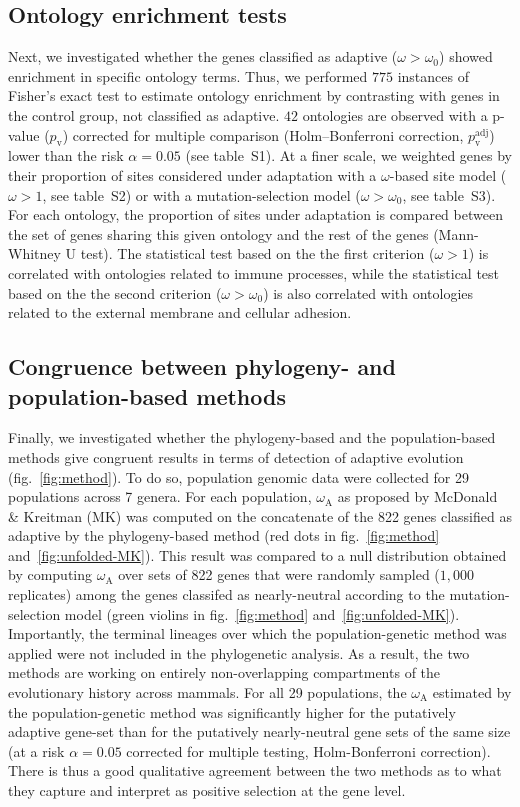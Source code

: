 \documentclass{article}
\newcommand{\rateApop}{\omega_{\mathrm{A}}}
\begin{document}
    \subsection*{Ontology enrichment tests}
    Next, we investigated whether the genes classified as adaptive ($\omega > \omega_{0}$) showed enrichment in specific ontology terms.
    Thus, we performed $775$ instances of Fisher's exact test to estimate ontology enrichment by contrasting with genes in the control group, not classified as adaptive.
    $42$ ontologies are observed with a p-value ($p_{\mathrm{v}}$) corrected for multiple comparison (Holm–Bonferroni correction, $p_{\mathrm{v}}^{\mathrm{adj}}$) lower than the risk $\alpha=0.05$ (see table~S1).
    At a finer scale, we weighted genes by their proportion of sites considered under adaptation with a $\omega$-based site model ($\omega > 1$, see table~S2) or with a mutation-selection model ($\omega > \omega_{0}$, see table~S3).
    For each ontology, the proportion of sites under adaptation is compared between the set of genes sharing this given ontology and the rest of the genes (Mann-Whitney U test).
    The statistical test based on the the first criterion ($\omega>1$) is correlated with ontologies related to immune processes, while the statistical test based on the the second criterion ($\omega > \omega_{0}$) is also correlated with ontologies related to the external membrane and cellular adhesion.

    \subsection*{Congruence between phylogeny- and population-based methods}
    Finally, we investigated whether the phylogeny-based and the population-based methods give congruent results in terms of detection of adaptive evolution (fig.~\ref{fig:method}).
    To do so, population genomic data were collected for 29 populations across 7 genera.
    For each population, $\rateApop$ as proposed by McDonald \& Kreitman (MK)\cite{mcdonald_adaptative_1991} was computed on the concatenate of the 822 genes classified as adaptive by the phylogeny-based method (red dots in fig.~\ref{fig:method} and~\ref{fig:unfolded-MK}).
    This result was compared to a null distribution obtained by computing $\rateApop$ over sets of 822 genes that were randomly sampled ($1,000$ replicates) among the genes classifed as nearly-neutral according to the mutation-selection model (green violins in fig.~\ref{fig:method} and~\ref{fig:unfolded-MK}).
    Importantly, the terminal lineages over which the population-genetic method was applied were not included in the phylogenetic analysis.
    As a result, the two methods are working on entirely non-overlapping compartments of the evolutionary history across mammals.
    For all 29 populations, the $\rateApop$ estimated by the population-genetic method was significantly higher for the putatively adaptive gene-set than for the putatively nearly-neutral gene sets of the same size (at a risk $\alpha=0.05$ corrected for multiple testing, Holm-Bonferroni correction).
    There is thus a good qualitative agreement between the two methods as to what they capture and interpret as positive selection at the gene level.
\end{document}
